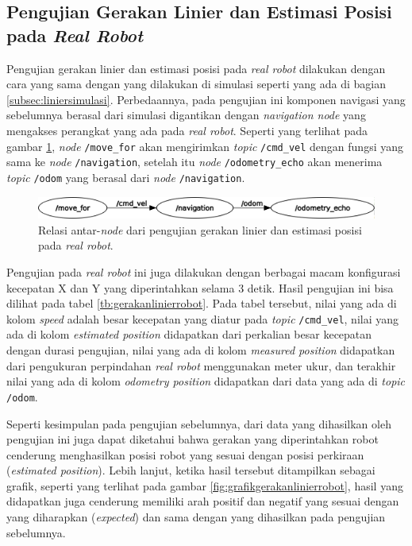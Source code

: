 \subsection{Pengujian Gerakan Linier dan Estimasi Posisi pada \emph{Real Robot}}
\label{subsec:linierrobot}

Pengujian gerakan linier dan estimasi posisi pada \emph{real robot} dilakukan dengan cara yang sama dengan yang dilakukan di simulasi seperti yang ada di bagian \ref{subsec:liniersimulasi}.
Perbedaannya, pada pengujian ini komponen navigasi yang sebelumnya berasal dari simulasi digantikan dengan \emph{navigation node} yang mengakses perangkat yang ada pada \emph{real robot}.
Seperti yang terlihat pada gambar \ref{fig:rosgraphnavigation},
  \emph{node} \lstinline{/move_for} akan mengirimkan \emph{topic} \lstinline{/cmd_vel} dengan fungsi yang sama ke \emph{node} \lstinline{/navigation},
  setelah itu \emph{node} \lstinline{/odometry_echo} akan menerima \emph{topic} \lstinline{/odom} yang berasal dari \emph{node} \lstinline{/navigation}.

\begin{figure} [ht]
  \centering
  \includegraphics[scale=0.3]{gambar/rosgraph-navigation.png}
  \caption{Relasi antar-\emph{node} dari pengujian gerakan linier dan estimasi posisi pada \emph{real robot}.}
  \label{fig:rosgraphnavigation}
\end{figure}

Pengujian pada \emph{real robot} ini juga dilakukan dengan berbagai macam konfigurasi kecepatan X dan Y yang diperintahkan selama 3 detik.
Hasil pengujian ini bisa dilihat pada tabel \ref{tb:gerakanlinierrobot}.
Pada tabel tersebut, nilai yang ada di kolom \emph{speed} adalah besar kecepatan yang diatur pada \emph{topic} \lstinline{/cmd_vel},
  nilai yang ada di kolom \emph{estimated position} didapatkan dari perkalian besar kecepatan dengan durasi pengujian,
  nilai yang ada di kolom \emph{measured position} didapatkan dari pengukuran perpindahan \emph{real robot} menggunakan meter ukur,
  dan terakhir nilai yang ada di kolom \emph{odometry position} didapatkan dari data yang ada di \emph{topic} \lstinline{/odom}.



Seperti kesimpulan pada pengujian sebelumnya,
  dari data yang dihasilkan oleh pengujian ini juga dapat diketahui bahwa gerakan yang diperintahkan robot cenderung menghasilkan posisi robot yang sesuai dengan posisi perkiraan (\emph{estimated position}).
Lebih lanjut, ketika hasil tersebut ditampilkan sebagai grafik,
  seperti yang terlihat pada gambar \ref{fig:grafikgerakanlinierrobot},
  hasil yang didapatkan juga cenderung memiliki arah positif dan negatif yang sesuai dengan yang diharapkan (\emph{expected}) dan sama dengan yang dihasilkan pada pengujian sebelumnya.


